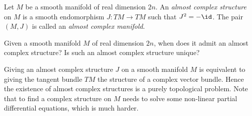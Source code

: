     \begin{definition}\label{def:almost_complex_structure}
        Let \(M\) be a smooth manifold of real dimension \(2n\).
        An \emph{almost complex structure} on \(M\) is a smooth endomorphism \(J: TM\to TM\) such that \(J^2 = -\id\).
        The pair \((M,J)\) is called an \emph{almost complex manifold}.
    \end{definition}


    \begin{question}\label{qs:existence_of_almost_complex_structure}
        Given a smooth manifold \(M\) of real dimension \(2n\), when does it admit an almost complex structure?
        Is such an almost complex structure unique?
    \end{question}

    Giving an almost complex structure \(J\) on a smooth manifold \(M\) is equivalent to giving the tangent bundle \(TM\) the structure of a complex vector bundle.
    Hence the existence of almost complex structures is a purely topological problem.
    Note that to find a complex structure on \(M\) needs to solve some non-linear partial differential equations, which is much harder.

